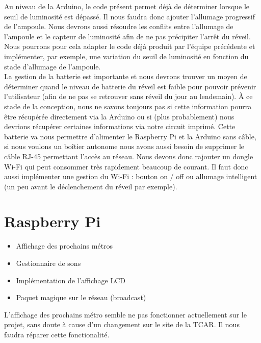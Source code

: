 Au niveau de la Arduino, le code présent permet déjà de déterminer lorsque le seuil de luminosité est dépassé. Il nous faudra donc ajouter l'allumage progressif de l'ampoule. Nous devrons aussi résoudre les conflits entre l'allumage de l'ampoule et le capteur de luminosité afin de ne pas précipiter l'arrêt du réveil. Nous pourrons pour cela adapter le code déjà produit par l'équipe précédente et implémenter, par exemple, une variation du seuil de luminosité en fonction du stade d'allumage de l'ampoule. \\

La gestion de la batterie est importante et nous devrons trouver un moyen de déterminer quand le niveau de batterie du réveil est faible pour pouvoir prévenir l'utilisateur (afin de ne pas se retrouver sans réveil du jour au lendemain). À ce stade de la conception, nous ne savons toujours pas si cette information pourra être récupérée directement via la Arduino ou si (plus probablement) nous devrions récupérer certaines informations via notre circuit imprimé. Cette batterie va nous permettre d'alimenter le Raspberry Pi et la Arduino sans câble, si nous voulons un boîtier autonome nous avons aussi besoin de supprimer le câble RJ-45 permettant l'accès au réseau. Nous devons donc rajouter un dongle Wi-Fi qui peut consommer très rapidement beaucoup de courant. Il faut donc aussi implémenter une gestion du Wi-Fi : bouton on / off ou allumage intelligent (un peu avant le déclenchement du réveil par exemple). \\


\section{Raspberry Pi} %
\label{sec:raspberry_pi}

\begin{itemize}
	\item Affichage des prochains métros
	\item Gestionnaire de sons
	\item Implémentation de l'affichage LCD
	\item Paquet magique sur le réseau (broadcast) 
\end{itemize}
\vspace{20px}

L'affichage des prochains métro semble ne pas fonctionner actuellement sur le projet, sans doute à cause d'un changement sur le site de la TCAR. Il nous faudra réparer cette fonctionalité. \\

